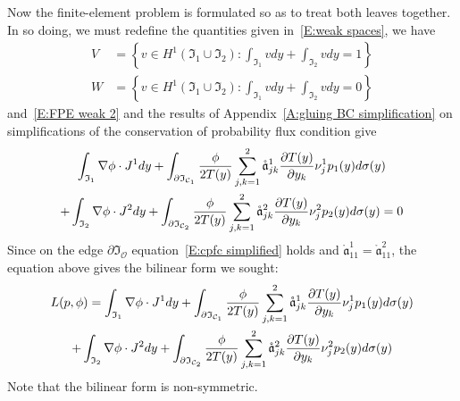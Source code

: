 Now the finite-element problem is formulated so as to treat both leaves together. In so doing, we must redefine the quantities given in~\eqref{E:weak spaces}, we have
\begin{align*}
V &= \left\{v \in H^1(\mathfrak I_1 \cup \mathfrak I_2): \int_\mathfrak{I_1} v dy + \int_\mathfrak{I_2} v dy = 1\right\}\\
W &= \left\{v \in H^1(\mathfrak I_1 \cup \mathfrak I_2): \int_\mathfrak{I_1} v dy + \int_\mathfrak{I_2} v dy = 0\right\}
\end{align*}
and~\eqref{E:FPE weak 2} and the results of Appendix~\ref{A:gluing BC simplification} on simplifications of the conservation of probability flux condition give
\begin{multline*}
\int_{\mathfrak I_1} \nabla \phi \cdot J^1 dy + \int_{\partial \mathfrak I_{\mathcal C_1}} \frac{\phi}{2 T(y)} \sum_{j,k=1}^2 \mathring{\mathfrak{a}}_{jk}^1 \frac{\partial T(y)}{\partial y_k} \nu_j^1 p_1(y) d\sigma(y)\\
+ \int_{\mathfrak I_2} \nabla \phi \cdot J^2 dy + \int_{\partial \mathfrak I_{\mathcal C_2}} \frac{\phi}{2 T(y)} \sum_{j,k=1}^2 \mathring{\mathfrak{a}}_{jk}^2 \frac{\partial T(y)}{\partial y_k} \nu_j^2 p_2(y) d\sigma(y) = 0
\end{multline*}
Since on the edge $\partial \mathfrak I_\mathcal{O}$ equation~\eqref{E:cpfc simplified} holds and $\mathring{\mathfrak{a}}_{11}^1 = \mathring{\mathfrak{a}}_{11}^2$, the equation above gives the bilinear form we sought:
\begin{multline}
\label{E:weak FPE}
L(p,\phi) = \int_{\mathfrak I_1} \nabla \phi \cdot J^1 dy + \int_{\partial \mathfrak I_{\mathcal C_1}} \frac{\phi}{2 T(y)} \sum_{j,k=1}^2 \mathring{\mathfrak{a}}_{jk}^1 \frac{\partial T(y)}{\partial y_k} \nu_j^1 p_1(y) d\sigma(y)\\
+ \int_{\mathfrak I_2} \nabla \phi \cdot J^2 dy + \int_{\partial \mathfrak I_{\mathcal C_2}} \frac{\phi}{2 T(y)} \sum_{j,k=1}^2 \mathring{\mathfrak{a}}_{jk}^2 \frac{\partial T(y)}{\partial y_k} \nu_j^2 p_2(y) d\sigma(y)
\end{multline}
Note that the bilinear form is non-symmetric.

